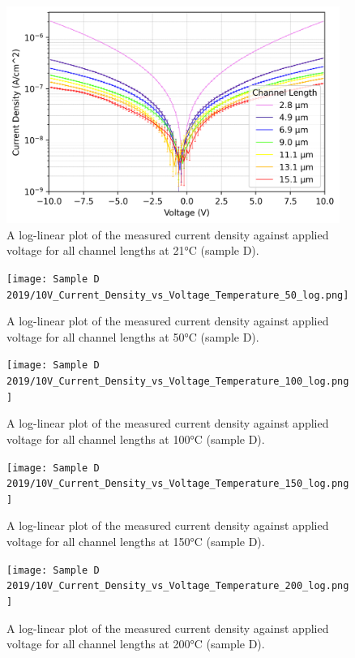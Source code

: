 \begin{figure}[h]
    \centering
    \includegraphics[width=0.97\textwidth]{Chapter6/Figs/Raster/Sample D 2019/10V_Current_Density_vs_Voltage_Temperature_21_log.png}
    \caption{A log-linear plot of the measured current density against applied voltage for all channel lengths at 21\si{\degreeCelsius} (sample D).}
    \label{appfig:10V_D_current_density_21}
\end{figure}
\begin{figure}[h]
    \centering
    \texttt{[image: Sample D 2019/10V\_Current\_Density\_vs\_Voltage\_Temperature\_50\_log.png]}
    \caption{A log-linear plot of the measured current density against applied voltage for all channel lengths at 50\si{\degreeCelsius} (sample D).}
    \label{appfig:10V_D_current_density_50}
\end{figure}
\begin{figure}[h]
    \centering
    \texttt{[image: Sample D 2019/10V\_Current\_Density\_vs\_Voltage\_Temperature\_100\_log.png]}
    \caption{A log-linear plot of the measured current density against applied voltage for all channel lengths at 100\si{\degreeCelsius} (sample D).}
    \label{appfig:10V_D_current_density_100}
\end{figure}
\begin{figure}[h]
    \centering
    \texttt{[image: Sample D 2019/10V\_Current\_Density\_vs\_Voltage\_Temperature\_150\_log.png]}
    \caption{A log-linear plot of the measured current density against applied voltage for all channel lengths at 150\si{\degreeCelsius} (sample D).}
    \label{appfig:10V_D_current_density_150}
\end{figure}
\begin{figure}[h]
    \centering
    \texttt{[image: Sample D 2019/10V\_Current\_Density\_vs\_Voltage\_Temperature\_200\_log.png]}
    \caption{A log-linear plot of the measured current density against applied voltage for all channel lengths at 200\si{\degreeCelsius} (sample D).}
    \label{appfig:10V_D_current_density_200}
\end{figure}
